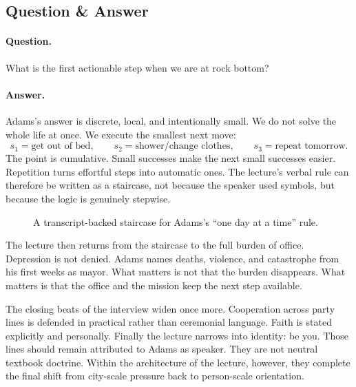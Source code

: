 \subsection{Question \& Answer}

\paragraph{Question.} What is the first actionable step when we are at rock bottom?

\paragraph{Answer.} Adams's answer is discrete, local, and intentionally small. We do not solve the whole life at once. We execute the smallest next move:
\begin{equation}
s_1=\text{get out of bed},\qquad
s_2=\text{shower/change clothes},\qquad
s_3=\text{repeat tomorrow}.
\end{equation}
The point is cumulative. Small successes make the next small successes easier. Repetition turns effortful steps into automatic ones. The lecture's verbal rule can therefore be written as a staircase, not because the speaker used symbols, but because the logic is genuinely stepwise.

\begin{figure}
\centering
{}
\caption{A transcript-backed staircase for Adams's ``one day at a time'' rule.}
\end{figure}

The lecture then returns from the staircase to the full burden of office. Depression is not denied. Adams names deaths, violence, and catastrophe from his first weeks as mayor. What matters is not that the burden disappears. What matters is that the office and the mission keep the next step available.

The closing beats of the interview widen once more. Cooperation across party lines is defended in practical rather than ceremonial language. Faith is stated explicitly and personally. Finally the lecture narrows into identity: be you. Those lines should remain attributed to Adams as speaker. They are not neutral textbook doctrine. Within the architecture of the lecture, however, they complete the final shift from city-scale pressure back to person-scale orientation.

